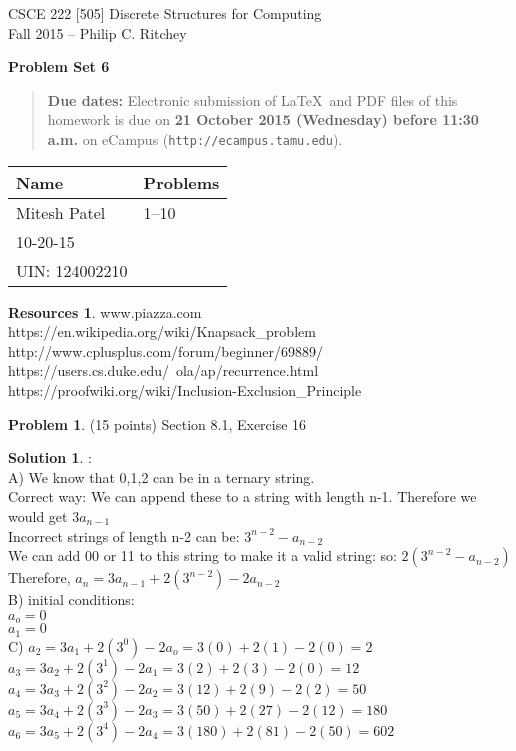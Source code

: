 \documentclass{article}
\theoremstyle{definition}
\newtheorem{problem}{Problem}
\newtheorem*{solution}{Solution}
\newtheorem*{resources}{Resources}
\newcommand{\names}[5]{
\begin{center}
\begin{tabular}{|ll|}
\hline
\textbf{Name}  & \textbf{Problems}\\
\hline
#1 & 1--10\\
#2 & #3\\
#4 & #5\\
\hline
\end{tabular}
\end{center}
}
\newcommand{\problemset}[1]{\begin{center}\textbf{Problem Set #1}\end{center}}
\newcommand{\duedate}[1]{\begin{quote}\textbf{Due dates:} Electronic
    submission of \LaTeX\ and PDF files of this homework is due on
    \textbf{#1} on eCampus (\texttt{http://ecampus.tamu.edu}). 
    \end{quote}}
\begin{document}
\begin{center}
{\large
CSCE 222 [505] Discrete Structures for Computing\\[.5ex]
Fall 2015 -- Philip C. Ritchey\\}
\end{center}

\problemset{6}

\duedate{21 October 2015 (Wednesday) before 11:30 a.m.}

\names{Mitesh Patel}
{10-20-15}{}
{UIN: 124002210}{}

\begin{resources} www.piazza.com \\
https://en.wikipedia.org/wiki/Knapsack\_problem\\
http://www.cplusplus.com/forum/beginner/69889/ \\
https://users.cs.duke.edu/~ola/ap/recurrence.html \\
https://proofwiki.org/wiki/Inclusion-Exclusion\_Principle


\end{resources}

\bigskip

\begin{problem} (15 points) Section 8.1, Exercise 16
\end{problem}
\begin{solution} :
\\
A) We know that 0,1,2 can be in a ternary string.
\\
Correct way: We can append these to a string with length n-1. Therefore we would get $3a_{n-1}$
\\
Incorrect strings of length n-2 can be: $3^{n-2} - a_{n-2}$
\\
We can add 00 or 11 to this string to make it a valid string: so: $2(3^{n-2}-a_{n-2})$
\\
Therefore, $a_n = 3a_{n-1}+2(3^{n-2}) - 2a_{n-2}$
\\

B) initial conditions:
\\
$a_o = 0$
\\
$a_1 = 0$
\\

C) $a_2 = 3a_1+2(3^0) - 2a_o = 3(0)+2(1)-2(0) = 2$
\\
$a_3 = 3a_2+2(3^1) - 2a_1 = 3(2)+2(3)-2(0) = 12$
\\
$a_4 = 3a_3+2(3^2) - 2a_2 = 3(12)+2(9)-2(2) = 50$
\\
$a_5 = 3a_4+2(3^3) - 2a_3 = 3(50)+2(27)-2(12) = 180$
\\
$a_6 = 3a_5+2(3^4) - 2a_4 = 3(180)+2(81)-2(50) = 602$

\end{solution}
\end{document}
